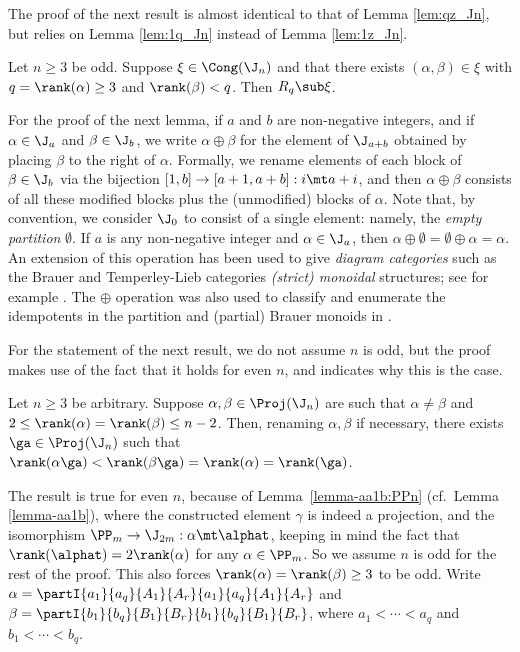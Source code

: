The proof of the next result is almost identical to that of Lemma \ref{lem:qz_Jn}, but relies on Lemma \ref{lem:1q_Jn} instead of Lemma \ref{lem:1z_Jn}.


\begin{lemma}
\label{lem:pq2_Jn}
Let $n\geq3$ be odd.  Suppose $\xi\in\Cong(\J_n)$ and that there exists $(\alpha,\beta)\in\xi$ with $q=\rank(\alpha)\geq3$ and $\rank(\beta)<q$.  Then $R_q\sub\xi$. \epfres
\end{lemma}



For the proof of the next lemma, if $a$ and $b$ are non-negative integers, and if $\alpha\in\J_a$ and $\beta\in\J_b$, we write $\alpha\oplus\beta$ for the element of $\J_{a+b}$ obtained by placing $\beta$ to the right of $\alpha$.  Formally, we rename elements of each block of $\beta\in\J_b$ via the bijection $[1,b]\to[a+1,a+b]:i\mt a+i$, and then $\alpha\oplus\beta$ consists of all these modified blocks plus the (unmodified) blocks of $\alpha$.  Note that, by convention, we consider $\J_0$ to consist of a single element: namely, the \emph{empty partition} $\emptyset$.  If $a$ is any non-negative integer and $\alpha\in\J_a$, then $\alpha\oplus\emptyset=\emptyset\oplus\alpha=\alpha$.  An extension of this operation has been used to give \emph{diagram categories} such as the Brauer and Temperley-Lieb categories \emph{(strict) monoidal} structures; see for example \cite{LZ2015,Martin2008}.  The $\oplus$ operation was also used to classify and enumerate the idempotents in the partition and (partial) Brauer monoids in \cite{DEEFHHL1}.  

For the statement of the next result, we do not assume $n$ is odd, but the proof makes use of the fact that it holds for even $n$, and indicates why this is the case.


\begin{lemma}\label{lem:proj2_Jn}
Let $n\geq3$ be arbitrary.  Suppose $\alpha,\beta\in\Proj(\J_n)$ are such that $\alpha\not=\beta$ and $2\leq\rank(\alpha)=\rank(\beta)\leq n-2$.  Then, renaming $\alpha,\beta$ if necessary, there exists $\ga\in\Proj(\J_n)$ such that $\rank(\alpha\ga)<\rank(\beta\ga)=\rank(\alpha)=\rank(\ga)$.
\end{lemma}


\pf The result is true for even $n$, because of Lemma~\ref{lemma-aa1b:PPn} (cf.~Lemma \ref{lemma-aa1b}), where the constructed element $\gamma$ is indeed a projection, and the isomorphism ${\PP_m\to\J_{2m}:\alpha\mt\alphat}$, keeping in mind the fact that $\rank(\alphat)=2\rank(\alpha)$ for any $\alpha\in\PP_m$.  So we assume $n$ is odd for the rest of the proof.  This also forces $\rank(\alpha)=\rank(\beta)\geq3$ to be odd. Write $\alpha=\partI{a_1}{a_q}{A_1}{A_r}{a_1}{a_q}{A_1}{A_r}$ and $\beta=\partI{b_1}{b_q}{B_1}{B_r}{b_1}{b_q}{B_1}{B_r}$, where $a_1<\cdots<a_q$ and $b_1<\cdots<b_q$.  



